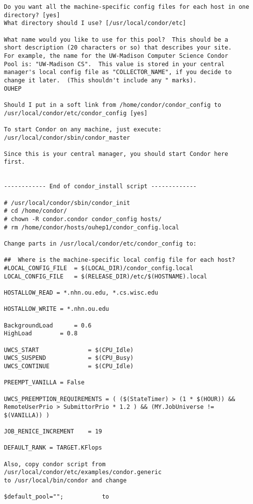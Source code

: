 \documentclass{revtex4}
\begin{document}
\begin{appendix}
\begin{verbatim}
Do you want all the machine-specific config files for each host in one
directory? [yes] 
What directory should I use? [/usr/local/condor/etc] 

What name would you like to use for this pool?  This should be a
short description (20 characters or so) that describes your site.
For example, the name for the UW-Madison Computer Science Condor
Pool is: "UW-Madison CS".  This value is stored in your central
manager's local config file as "COLLECTOR_NAME", if you decide to
change it later.  (This shouldn't include any " marks).
OUHEP

Should I put in a soft link from /home/condor/condor_config to
/usr/local/condor/etc/condor_config [yes] 

To start Condor on any machine, just execute:
/usr/local/condor/sbin/condor_master

Since this is your central manager, you should start Condor here first.


------------ End of condor_install script -------------

# /usr/local/condor/sbin/condor_init
# cd /home/condor/
# chown -R condor.condor condor_config hosts/
# rm /home/condor/hosts/ouhep1/condor_config.local 

Change parts in /usr/local/condor/etc/condor_config to:

##  Where is the machine-specific local config file for each host?
#LOCAL_CONFIG_FILE	= $(LOCAL_DIR)/condor_config.local
LOCAL_CONFIG_FILE	= $(RELEASE_DIR)/etc/$(HOSTNAME).local

HOSTALLOW_READ = *.nhn.ou.edu, *.cs.wisc.edu

HOSTALLOW_WRITE = *.nhn.ou.edu

BackgroundLoad		= 0.6
HighLoad		= 0.8

UWCS_START              = $(CPU_Idle)
UWCS_SUSPEND            = $(CPU_Busy)
UWCS_CONTINUE           = $(CPU_Idle)

PREEMPT_VANILLA = False

UWCS_PREEMPTION_REQUIREMENTS = ( ($(StateTimer) > (1 * $(HOUR)) && RemoteUserPrio > SubmittorPrio * 1.2 ) && (MY.JobUniverse != $(VANILLA)) )

JOB_RENICE_INCREMENT	= 19

DEFAULT_RANK = TARGET.KFlops

Also, copy condor script from /usr/local/condor/etc/examples/condor.generic 
to /usr/local/bin/condor and change

$default_pool="";           to 


\end{verbatim}
\end{appendix}
\end{document}
